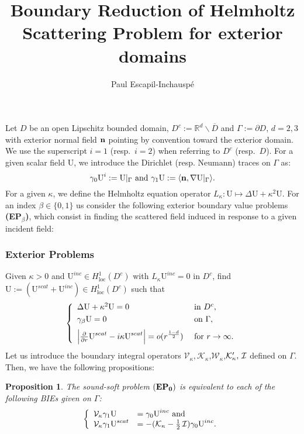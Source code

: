 \documentclass[1pt]{article}
\title{Boundary Reduction of Helmholtz Scattering Problem for exterior domains}
\author{Paul Escapil-Inchausp\'e}
\newcommand{\be}{\begin{equation}}
\newcommand{\ee}{\end{equation}}
\newcommand{\IR}{\mathbb{R}}
\newcommand{\bn}{{\bf n}}
\newcommand{\mK}{\mathcal{K}}
\newcommand{\mI}{\nobreak\hspace{.16667em plus .08333em}\mathcal{I}}
\newcommand{\mV}{\mathcal{V}}
\newcommand{\mW}{\mathcal{W}}
\newcommand{\U}{{\text{U}}}
\newtheorem{proposition}{Proposition}
\begin{document}
\maketitle

Let $D$ be an open Lipschitz bounded domain, $D^c:=\IR^d\backslash \overline{D}$ and $\Gamma:=\partial D$, $d=2,3$ with exterior normal field $\bn$ pointing by convention toward the exterior domain. We use the superscript $i=1$ (resp.~$i=2$) when referring to $D^c$ (resp.~$D$). For a given scalar field $\U$, we introduce the Dirichlet (resp. Neumann) traces on $\Gamma$ as:
\be
\gamma_0 \U^i:= \U|_\Gamma \text{ and } \gamma_1 \U:= \langle \bn, \nabla \U|_\Gamma  \rangle.
\ee
For a given $\kappa$, we define the Helmholtz equation operator $L_\kappa:\U \mapsto \Delta \U + \kappa^2 \U$. For an index $\beta \in \{0,1\}$ us consider the following exterior boundary value problems {\bf (EP$_\beta$)}, which consist in finding the scattered field induced in response to a given incident field:

\subsubsection*{Exterior Problems}
\label{subsubs:EP_0}
Given $\kappa>0$ and $\U^{inc} \in H_{\text{loc}}^1(D^c)$ with $L_\kappa \U^{inc}=0$ in $D^c$, find $\U:=(\U^{scat}+\U^{inc}) \in H_{\text{loc}}^1(D^c)$ such that
\be
\left\{
\label{eq:EP_0}
\begin{array}{ll}
\Delta\U+\kappa^2\U  = 0&\text{ in } D^c,\\
\noalign{\vspace{3pt}}
  \gamma_{\beta} \U = 0&\text{ on } \Gamma,\\
  \noalign{\vspace{6pt}}
   \Big|\frac{\partial}{\partial r} \U^{scat}-i\kappa \U^{scat}\Big| = o(r^{\frac{1-d}{2}}) &\text{ for } r \to \infty.
\end{array}
\right.
\ee
Let us introduce the boundary integral operators $\mV_\kappa,\mK_\kappa$,$\mW_\kappa$,$\mK_\kappa',\mI$ defined on $\Gamma$.
Then, we have the following propositions:
\begin{proposition}
The \emph{sound-soft} problem ${\bf (EP_0)}$ is equivalent to each of the following BIEs given on $\Gamma$:
\be
\left\{
\label{eq:B_EP_0}
\begin{array}{ll}
\mathcal{V}_\kappa \gamma_1 \U &= \gamma_0 \U^{inc}\text{ and }\\
\mathcal{V}_\kappa \gamma_1 \U^{scat} &= -(\mathcal{K}_\kappa-\frac{1}{2}\mI) \gamma_0 \U^{inc}.
\end{array}
\right.
\ee
\end{proposition}
\end{document}
